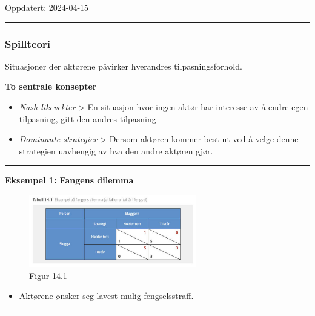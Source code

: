 \documentclass[
  letterpaper,
  DIV=11,
  numbers=noendperiod]{scrartcl}
\providecommand{\tightlist}{%
  \setlength{\itemsep}{0pt}\setlength{\parskip}{0pt}}\usepackage{longtable,booktabs,array}
\begin{document}
Oppdatert: 2024-04-15

\begin{center}\rule{0.5\linewidth}{0.5pt}\end{center}

\subsubsection{Spillteori}\label{spillteori}

Situasjoner der aktørene påvirker hverandres tilpasningsforhold.

\textbf{To sentrale konsepter}

\begin{itemize}
\tightlist
\item
  \emph{Nash-likevekter} \textgreater{} En situasjon hvor ingen aktør
  har interesse av å endre egen tilpasning, gitt den andres tilpasning
\item
  \emph{Dominante strategier} \textgreater{} Dersom aktøren kommer best
  ut ved å velge denne strategien uavhengig av hva den andre aktøren
  gjør.
\end{itemize}

\begin{center}\rule{0.5\linewidth}{0.5pt}\end{center}

\textbf{Eksempel 1: Fangens dilemma}

\begin{figure}[H]

{\centering \includegraphics[width=0.65\textwidth,height=\textheight]{drawio/tabell_14.1.png}

}

\caption{Figur 14.1}

\end{figure}%

\begin{itemize}
\tightlist
\item
  Aktørene ønsker seg lavest mulig fengselsstraff.
\end{itemize}

\begin{center}\rule{0.5\linewidth}{0.5pt}\end{center}
\end{document}
